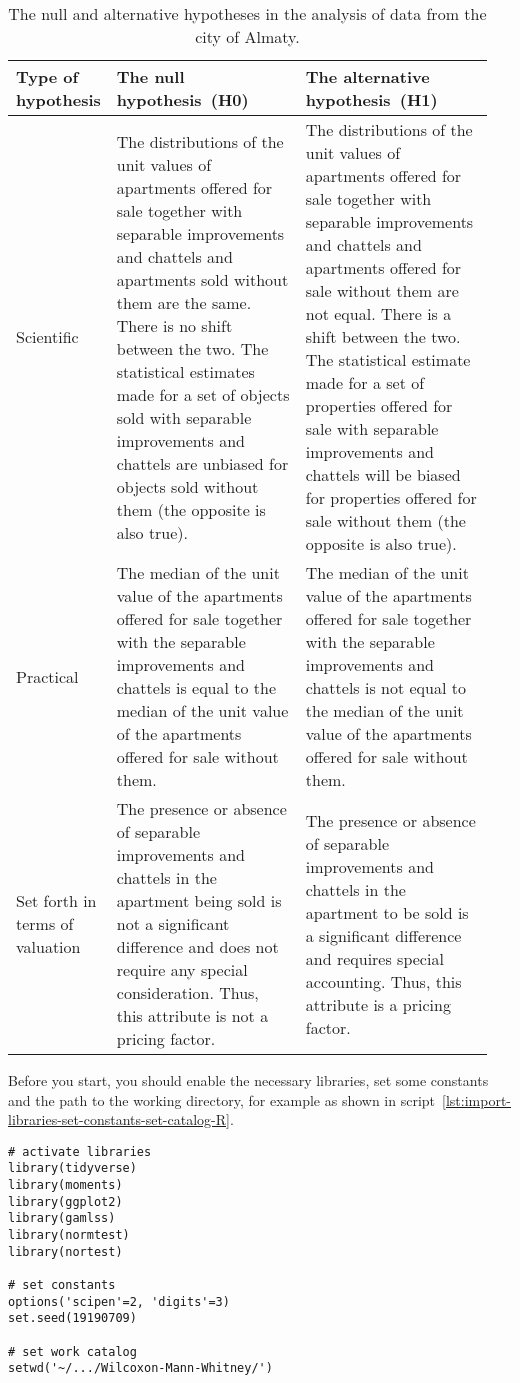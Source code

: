 \documentclass[]{scrreprt}
\begin{document}
\begin{table}[htp]
	\caption{The null and alternative hypotheses in the analysis of data from the city of Almaty.} \label{tab:nul-alt-hypothesis-almaty}
	\centering
	\begin{tabularx}{\textwidth}{p{0.15\linewidth} p{0.4\linewidth} p{0.4\linewidth}} 
		\hline
		Type of hypothesis&The null hypothesis~(H0)&The alternative hypothesis~(H1)\\
		\hline
		Scientific&The distributions of the unit values of apartments offered for sale together with separable improvements and chattels and apartments sold without them are the same. There is no shift between the two. The statistical estimates made for a set of objects sold with separable improvements and chattels are unbiased for objects sold without them (the opposite is also true).&The distributions of the unit values of apartments offered for sale together with separable improvements and chattels and apartments offered for sale without them are not equal. There is a shift between the two. The statistical estimate made for a set of properties offered for sale with separable improvements and chattels will be biased for properties offered for sale without them (the opposite is also true).\\
		\hline
		Practical&The median of the unit value of the apartments offered for sale together with the separable improvements and chattels is equal to the median of the unit value of the apartments offered for sale without them.&The median of the unit value of the apartments offered for sale together with the separable improvements and chattels is not equal to the median of the unit value of the apartments offered for sale without them.\\
		\hline
		Set forth in terms of valuation&The presence or absence of separable improvements and chattels in the apartment being sold is not a significant difference and does not require any special consideration. Thus, this attribute is not a pricing factor.&The presence or absence of separable improvements and chattels in the apartment to be sold is a significant difference and requires special accounting. Thus, this attribute is a pricing factor.\\
		\hline
	\end{tabularx}
\end{table}
%
Before you start, you should enable the necessary libraries, set some constants and the path to the working directory, for example as shown in script~\ref{lst:import-libraries-set-constants-set-catalog-R}.
%
\begin{lstlisting}[float=htp, caption = Enables libraries and specifies the values of constants and the path to the working directory, firstnumber=1, label= lst:import-libraries-set-constants-set-catalog-R]
# activate libraries
library(tidyverse)
library(moments)
library(ggplot2)
library(gamlss)
library(normtest)
library(nortest)

# set constants
options('scipen'=2, 'digits'=3)
set.seed(19190709)

# set work catalog
setwd('~/.../Wilcoxon-Mann-Whitney/')
\end{lstlisting}  
%
\end{document}
